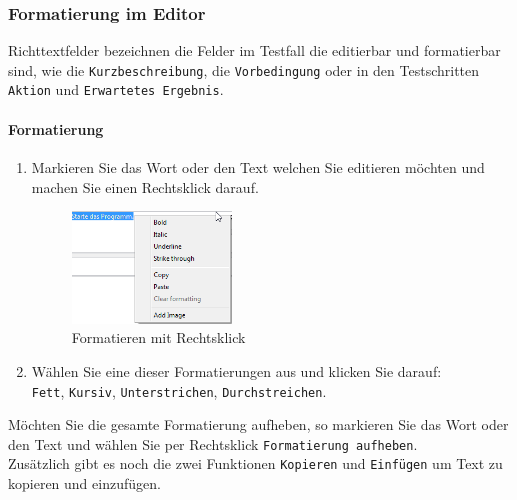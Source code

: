 \documentclass[11pt,a4paper,titlepage]{article}
\begin{document}
\subsubsection{Formatierung im Editor}
Richttextfelder bezeichnen die Felder im Testfall die editierbar und formatierbar sind, wie die \texttt{Kurzbeschreibung}, die \texttt{Vorbedingung} oder in den Testschritten \texttt{Aktion} und \texttt{Erwartetes Ergebnis}.
\paragraph{Formatierung}
\begin{enumerate}
\item Markieren Sie das Wort oder den Text welchen Sie editieren möchten und machen Sie einen Rechtsklick darauf.

\begin{figure}[H]
\centering
\includegraphics[width= 160px]{BilderHandbuch/Testfall/Formatieren.png}
\caption{Formatieren mit Rechtsklick}
\label{fig:AddImage}
\end{figure}

\item Wählen Sie eine dieser Formatierungen aus und klicken Sie darauf:\\
\texttt{Fett}, \texttt{Kursiv}, \texttt{Unterstrichen}, \texttt{Durchstreichen}.
\end{enumerate}
Möchten Sie die gesamte Formatierung aufheben, so markieren Sie das Wort oder den Text und wählen Sie per Rechtsklick \texttt{Formatierung aufheben}.\\
Zusätzlich gibt es noch die zwei Funktionen \texttt{Kopieren} und \texttt{Einfügen} um Text zu kopieren und einzufügen. 
\end{document}
